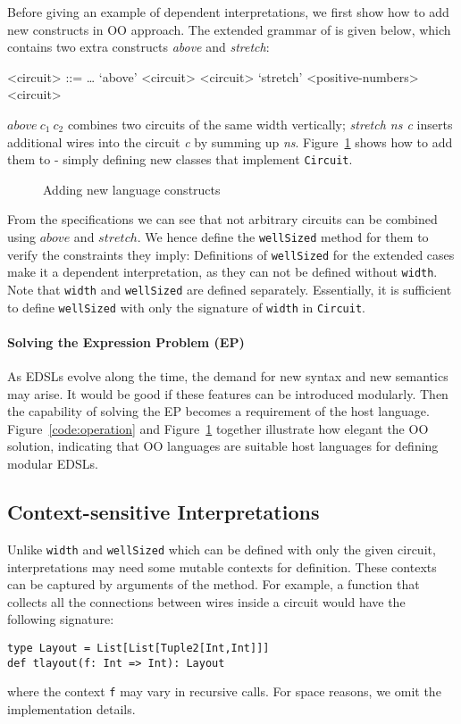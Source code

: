 Before giving an example of dependent interpretations, we first show how to add new
constructs in OO approach. The extended grammar of \dsl is given below,
which contains two extra constructs \emph{above} and \emph{stretch}:
\setlength{\grammarindent}{5em} %
\begin{grammar}
<circuit> ::= \ldots
\alt `above' <circuit> <circuit>
\alt `stretch' <positive-numbers> <circuit>
\end{grammar}
$above\ c_1\ c_2$ combines two circuits of the same width vertically;
\emph{stretch ns c} inserts additional wires into the circuit \emph{c} by
summing up \emph{ns}.
Figure~\ref{code:variant} shows how to add them to \dsl - simply defining new classes that implement \lstinline{Circuit}.
\begin{figure}
\caption{Adding new language constructs}
\label{code:variant}
\end{figure}

From the specifications we can see that not arbitrary circuits can be combined using $above$ and $stretch$.
We hence define the \lstinline{wellSized} method for them to
verify the constraints they imply:
Definitions of \lstinline{wellSized} for the extended cases make it a dependent
interpretation, as they can not be defined without \lstinline{width}.
Note that \lstinline{width} and \lstinline{wellSized} are defined separately.
Essentially, it is sufficient to define \lstinline{wellSized} with only the signature of \lstinline{width} in \lstinline{Circuit}.

\paragraph{Solving the Expression Problem (EP)} As EDSLs evolve along the time, the
demand for new syntax and new semantics may arise. It would be good if
these features can be introduced modularly. Then the capability of solving the EP
becomes a requirement of the host language.
Figure~\ref{code:operation} and Figure~\ref{code:variant} together illustrate
how elegant the OO solution,
indicating that OO languages are suitable host languages for defining modular EDSLs.

\subsection{Context-sensitive Interpretations}
Unlike \lstinline{width} and \lstinline{wellSized} which can be defined with
only the given circuit, interpretations may need some mutable contexts for definition.
These contexts can be captured by arguments of the method. For example, a
function that collects all the connections between wires inside a circuit would have
the following signature:
\begin{lstlisting}
type Layout = List[List[Tuple2[Int,Int]]]
def tlayout(f: Int => Int): Layout
\end{lstlisting}
where the context \lstinline{f} may vary in recursive calls.
For space reasons, we omit the implementation details.